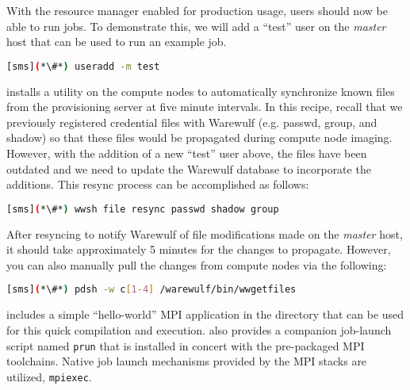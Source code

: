 With the resource manager enabled for production usage, users should now be
able to run jobs. To demonstrate this, we will add a ``test'' user on the {\em master}
host that can be used to run an example job.

\begin{lstlisting}[language=bash,keywords={}]
[sms](*\#*) useradd -m test
\end{lstlisting}

\Warewulf{} installs a utility on the compute nodes to automatically 
synchronize known files from the provisioning server at five minute intervals. In this
recipe, recall that we previously registered credential files with Warewulf (e.g. passwd,
group, and shadow) so that these files would be propagated during compute node
imaging. However, with the addition of a new ``test'' user above, the files
have been outdated and we need to update the Warewulf database to incorporate
the additions. This resync process can be accomplished as follows:

\begin{lstlisting}[language=bash,keywords={}]
[sms](*\#*) wwsh file resync passwd shadow group
\end{lstlisting}

\begin{center}
\begin{tcolorbox}[]
\small
After resyncing to notify Warewulf of file modifications made on the {\em
master} host, it should take approximately 5 minutes for the changes to
propagate. However, you can also manually pull the changes from compute nodes
via the following:
\begin{lstlisting}[language=bash,keywords={}]
[sms](*\#*) pdsh -w c[1-4] /warewulf/bin/wwgetfiles 
\end{lstlisting}
\end{tcolorbox}
\end{center}


\OHPC{} includes a simple ``hello-world'' MPI application in the
 directory that can be used for this quick
compilation and execution. \OHPC{} also provides a companion job-launch script
named \texttt{prun} that is installed in concert with the pre-packaged MPI
toolchains. Native job launch mechanisms provided by the MPI stacks are 
utilized, \texttt{mpiexec}.

